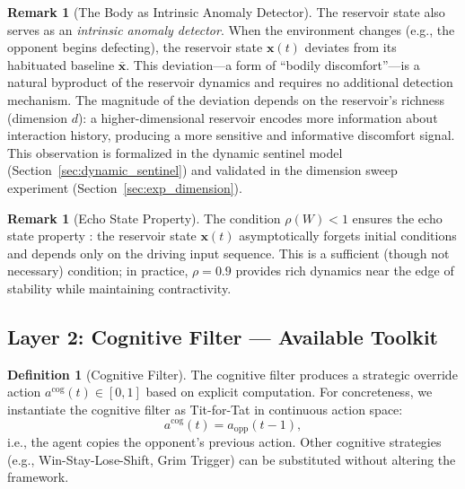 \documentclass[11pt,a4paper]{article}
\theoremstyle{definition}
\newtheorem{definition}[theorem]{Definition}
\newtheorem{remark}[theorem]{Remark}
\newcommand{\Wres}{W}
\newcommand{\xstate}{\mathbf{x}}
\newcommand{\acog}{a^{\mathrm{cog}}}
\begin{document}
\begin{remark}[The Body as Intrinsic Anomaly Detector]
\label{rem:body_anomaly}
The reservoir state also serves as an \emph{intrinsic anomaly detector}.
When the environment changes (e.g., the opponent begins defecting), the
reservoir state $\xstate(t)$ deviates from its habituated baseline
$\bar{\xstate}$.  This deviation---a form of ``bodily discomfort''---is
a natural byproduct of the reservoir dynamics and requires no additional
detection mechanism.  The magnitude of the deviation depends on the
reservoir's richness (dimension $d$): a higher-dimensional reservoir
encodes more information about interaction history, producing a more
sensitive and informative discomfort signal.  This observation is formalized
in the dynamic sentinel model (Section~\ref{sec:dynamic_sentinel}) and
validated in the dimension sweep experiment (Section~\ref{sec:exp_dimension}).
\end{remark}

\begin{remark}[Echo State Property]
The condition $\rho(\Wres) < 1$ ensures the echo state property
\citep{jaeger2001}: the reservoir state $\xstate(t)$ asymptotically forgets
initial conditions and depends only on the driving input sequence.
This is a sufficient (though not necessary) condition; in practice,
$\rho = 0.9$ provides rich dynamics near the edge of stability while
maintaining contractivity.
\end{remark}

\subsection{Layer 2: Cognitive Filter --- Available Toolkit}

\begin{definition}[Cognitive Filter]
\label{def:cognitive_filter}
The cognitive filter produces a strategic override action
$\acog(t) \in [0,1]$ based on explicit computation.  For concreteness,
we instantiate the cognitive filter as Tit-for-Tat in continuous action space:
\begin{equation}
\label{eq:tft}
\acog(t) = a_{\mathrm{opp}}(t-1),
\end{equation}
i.e., the agent copies the opponent's previous action.  Other cognitive
strategies (e.g., Win-Stay-Lose-Shift, Grim Trigger) can be substituted
without altering the framework.
\end{definition}
\end{document}
